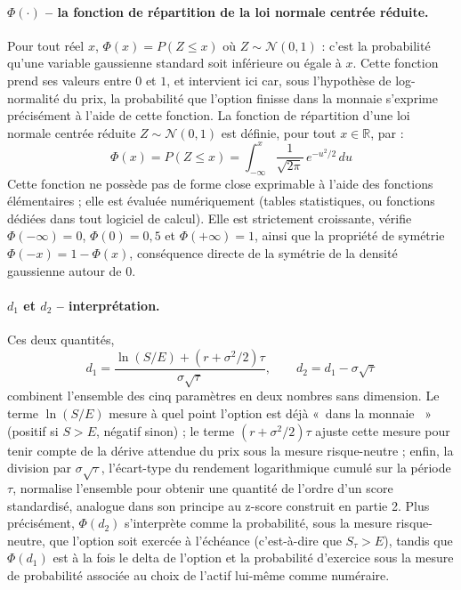 \documentclass{article}
\providecommand{\og}{«~}
\providecommand{\fg}{~»}
\begin{document}
\paragraph{$\Phi(\cdot)$ -- la fonction de répartition de la loi normale centrée réduite.} Pour tout réel $x$, $\Phi(x) = P(Z \leq x)$ où $Z \sim \mathcal{N}(0,1)$ : c'est la probabilité qu'une variable gaussienne standard soit inférieure ou égale à $x$. Cette fonction prend ses valeurs entre $0$ et $1$, et intervient ici car, sous l'hypothèse de log-normalité du prix, la probabilité que l'option finisse dans la monnaie s'exprime précisément à l'aide de cette fonction.
La fonction de répartition d'une loi normale centrée réduite $Z \sim \mathcal{N}(0,1)$ est définie, pour tout $x \in \mathbb{R}$, par :
\begin{equation}
\Phi(x) = P(Z \leq x) = \int_{-\infty}^{x} \frac{1}{\sqrt{2\pi}}\, e^{-u^2/2}\, du
\end{equation}
Cette fonction ne possède pas de forme close exprimable à l'aide des fonctions élémentaires ; elle est évaluée numériquement (tables statistiques, ou fonctions dédiées dans tout logiciel de calcul). Elle est strictement croissante, vérifie $\Phi(-\infty)=0$, $\Phi(0)=0{,}5$ et $\Phi(+\infty)=1$, ainsi que la propriété de symétrie $\Phi(-x) = 1-\Phi(x)$, conséquence directe de la symétrie de la densité gaussienne autour de $0$.
\paragraph{$d_1$ et $d_2$ -- interprétation.} Ces deux quantités,
\begin{equation}
d_1 = \frac{\ln(S/E) + (r+\sigma^2/2)\tau}{\sigma\sqrt{\tau}}, \qquad d_2 = d_1 - \sigma\sqrt{\tau}
\end{equation}
combinent l'ensemble des cinq paramètres en deux nombres sans dimension. Le terme $\ln(S/E)$ mesure à quel point l'option est déjà \og dans la monnaie \fg{} (positif si $S>E$, négatif sinon) ; le terme $(r+\sigma^2/2)\tau$ ajuste cette mesure pour tenir compte de la dérive attendue du prix sous la mesure risque-neutre ; enfin, la division par $\sigma\sqrt{\tau}$, l'écart-type du rendement logarithmique cumulé sur la période $\tau$, normalise l'ensemble pour obtenir une quantité de l'ordre d'un score standardisé, analogue dans son principe au z-score construit en partie 2. Plus précisément, $\Phi(d_2)$ s'interprète comme la probabilité, sous la mesure risque-neutre, que l'option soit exercée à l'échéance (c'est-à-dire que $S_\tau > E$), tandis que $\Phi(d_1)$ est à la fois le delta de l'option et la probabilité d'exercice sous la mesure de probabilité associée au choix de l'actif lui-même comme numéraire.
\end{document}
